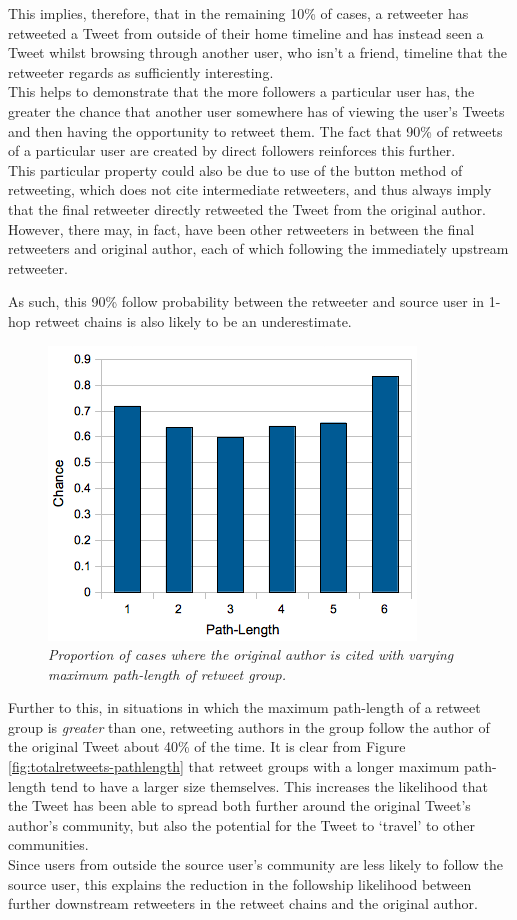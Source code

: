 This implies, therefore, that in the remaining 10\% of cases, a retweeter has retweeted a Tweet from outside of their home timeline and has instead seen a Tweet whilst browsing through another user, who isn't a friend, timeline that the retweeter regards as sufficiently interesting.\\
This helps to demonstrate that the more followers a particular user has, the greater the chance that another user somewhere has of viewing the user's Tweets and then having the opportunity to retweet them. The fact that 90\% of retweets of a particular user are created by direct followers reinforces this further.\\
This particular property could also be due to use of the button method of retweeting, which does not cite intermediate retweeters, and thus always imply that the final retweeter directly retweeted the Tweet from the original author. However, there may, in fact, have been other retweeters in between the final retweeters and original author, each of which following the immediately upstream retweeter.

As such, this 90\% follow probability between the retweeter and source user in 1-hop retweet chains is also likely to be an underestimate.

\begin{figure}[h]
\centering
\includegraphics[scale=0.6]{3.Chapter1/Media/mentionsoriginal-pathlength.png} 
\caption{\textit{Proportion of cases where the original author is cited with varying maximum path-length of retweet group.}}
\label{fig:citation-pathlength}
\end{figure}

Further to this, in situations in which the maximum path-length of a retweet group is \textit{greater} than one, retweeting authors in the group follow the author of the original Tweet about 40\% of the time. It is clear from Figure \ref{fig:totalretweets-pathlength} that retweet groups with a longer maximum path-length tend to have a larger size themselves. This increases the likelihood that the Tweet has been able to spread both further around the original Tweet's author's community, but also the potential for the Tweet to `travel' to other communities.\\
Since users from outside the source user's community are less likely to follow the source user, this explains the reduction in the followship likelihood between further downstream retweeters in the retweet chains and the original author.


